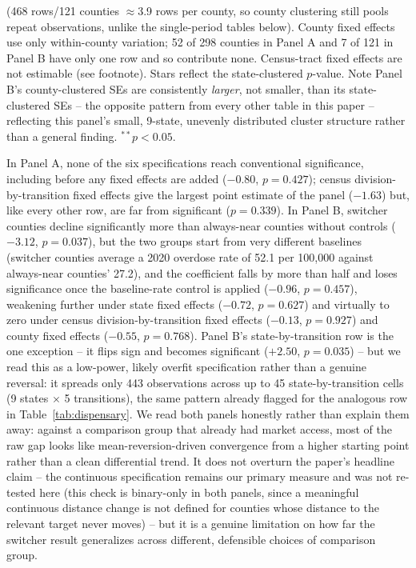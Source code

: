 \documentclass[preprint,12pt,authoryear]{elsarticle}
\begin{document}
\begin{table}[htbp]
\begin{minipage}{0.95\textwidth}
(468 rows/121 counties $\approx$3.9 rows per county, so county
clustering still pools repeat observations, unlike the single-period
tables below). County fixed effects use only within-county variation;
52 of 298 counties in Panel A and 7 of 121 in Panel B have only one row
and so contribute none. Census-tract fixed effects are not estimable
(see footnote). Stars reflect the state-clustered $p$-value. Note
Panel B's county-clustered SEs are consistently \emph{larger}, not
smaller, than its state-clustered SEs -- the opposite pattern from
every other table in this paper -- reflecting this panel's small,
9-state, unevenly distributed cluster structure rather than a general
finding. $^{**}p<0.05$.
\end{minipage}
\end{table}

In Panel A, none of the six specifications reach conventional
significance, including before any fixed effects are added ($-0.80$,
$p=0.427$); census division-by-transition fixed effects give the
largest point estimate of the panel ($-1.63$) but, like every other
row, are far from significant ($p=0.339$). In Panel B, switcher
counties decline significantly more than always-near counties without
controls ($-3.12$, $p=0.037$), but the two groups start from very
different baselines (switcher counties average a 2020 overdose rate of
52.1 per 100,000 against always-near counties' 27.2), and the
coefficient falls by more than half and loses significance once the
baseline-rate control is applied ($-0.96$, $p=0.457$), weakening
further under state fixed effects ($-0.72$, $p=0.627$) and virtually to
zero under census division-by-transition fixed effects ($-0.13$,
$p=0.927$) and county fixed effects ($-0.55$, $p=0.768$). Panel B's
state-by-transition row is the one exception -- it flips sign and
becomes significant ($+2.50$, $p=0.035$) -- but we read this as a
low-power, likely overfit specification rather than a genuine reversal:
it spreads only 443 observations across up to 45 state-by-transition
cells (9 states $\times$ 5 transitions), the same pattern already
flagged for the analogous row in Table~\ref{tab:dispensary}. We read
both panels honestly rather than explain them away: against a
comparison group that already had market access, most of the raw gap
looks like mean-reversion-driven convergence from a higher starting
point rather than a clean differential trend. It does not overturn the
paper's headline claim -- the continuous specification remains our
primary measure and was not re-tested here (this check is binary-only
in both panels, since a meaningful continuous distance change is not
defined for counties whose distance to the relevant target never
moves) -- but it is a genuine limitation on how far the switcher result
generalizes across different, defensible choices of comparison group.
\end{document}
